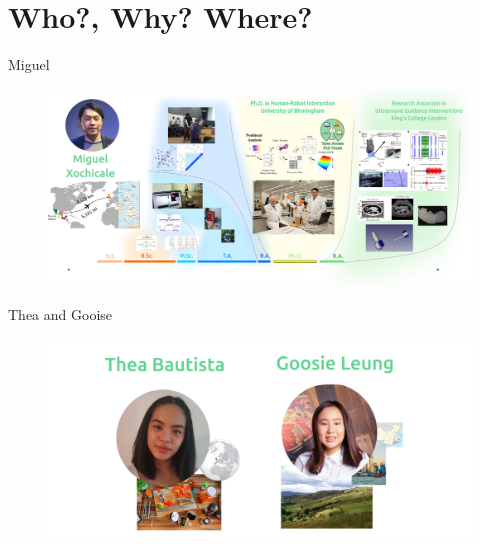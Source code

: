 \section{Who?, Why? Where?}



{
\begin{frame}{Miguel}

  \begin{figure}
  \centering
  \includegraphics[width=1.0\textwidth]{./../figures/team/miguel-xochicale/versions/drawing-v04.png}
  \end{figure}

\end{frame}
}



{
\begin{frame}{Thea and Gooise}

  \begin{figure}
  \centering
  \includegraphics[width=1.0\textwidth]{./../figures/team/who-we-are/versions/drawing-v12.png}
  \end{figure}

\end{frame}
}



